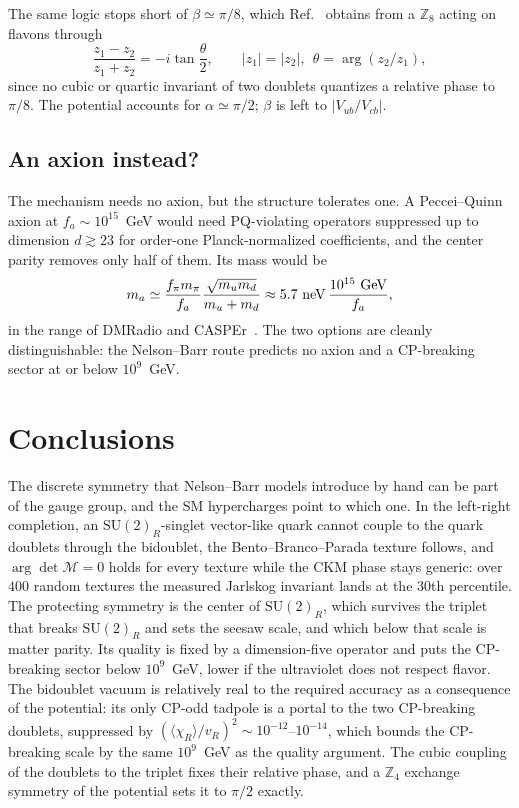 \documentclass[submission, Phys]{SciPost}
\newcommand{\SU}{\mathrm{SU}}
\newcommand{\Z}{\mathbb{Z}}
\newcommand{\vev}[1]{\langle #1\rangle}
\begin{document}
The same logic stops short of $\beta\simeq\pi/8$, which
Ref.~\cite{Arkani-Hamed:2026uos} obtains from a $\Z_8$ acting on flavons
through
\begin{equation}
  \frac{z_1-z_2}{z_1+z_2}=-i\tan\frac{\theta}{2},
  \qquad |z_1|=|z_2|,\ \ \theta=\arg(z_2/z_1),
  \label{eq:bisect}
\end{equation}
since no cubic or quartic invariant of two doublets quantizes a relative
phase to $\pi/8$. The potential accounts for $\alpha\simeq\pi/2$; $\beta$
is left to $|V_{ub}/V_{cb}|$.

\subsection{An axion instead?}

The mechanism needs no axion, but the structure tolerates one. A
Peccei--Quinn axion at $f_a\sim10^{15}$~GeV would need PQ-violating
operators suppressed up to dimension $d\gtrsim23$ for order-one
Planck-normalized coefficients, and the center parity removes only
half of them. Its mass would be
\begin{equation}
  m_a\simeq\frac{f_\pi m_\pi}{f_a}\frac{\sqrt{m_um_d}}{m_u+m_d}
  \approx 5.7~{\rm neV}\,\frac{10^{15}~{\rm GeV}}{f_a},
  \label{eq:ma}
\end{equation}
in the range of DMRadio and CASPEr~\cite{dmradio,casper}. The two
options are cleanly distinguishable: the Nelson--Barr route predicts
no axion and a CP-breaking sector at or below $10^9$~GeV.

\section{Conclusions}
\label{sec:conclusions}

The discrete symmetry that Nelson--Barr models introduce by hand can
be part of the gauge group, and the SM hypercharges point to which
one. In the left-right completion, an $\SU(2)_R$-singlet vector-like
quark cannot couple to the quark doublets through the bidoublet, the
Bento--Branco--Parada texture follows, and $\arg\det\mathcal M=0$ holds
for every texture while the CKM phase stays generic: over $400$ random
textures the measured Jarlskog invariant lands at the $30$th
percentile. The protecting symmetry is the center of $\SU(2)_R$, which
survives the triplet that breaks $\SU(2)_R$ and sets the seesaw scale,
and which below that scale is matter parity. Its quality is fixed by a
dimension-five operator and puts the CP-breaking sector below
$10^9$~GeV, lower if the ultraviolet does not respect flavor. The
bidoublet vacuum is relatively real to the required accuracy as a
consequence of the potential: its only CP-odd tadpole is a portal to the
two CP-breaking doublets, suppressed by
$(\vev{\chi_R}/v_R)^2\sim10^{-12}$--$10^{-14}$, which bounds the
CP-breaking scale by the same $10^9$~GeV as the quality argument. The
cubic coupling of the doublets to the triplet fixes their relative phase,
and a $\Z_4$ exchange symmetry of the potential sets it to $\pi/2$
exactly.
\end{document}
